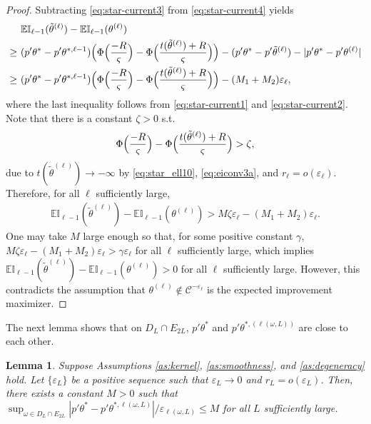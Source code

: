 \documentclass[letterpaper,11pt]{article}
\theoremstyle{myplain}
\newtheorem{lemma}{Lemma}[section]
\theoremstyle{mydefinition}
\theoremstyle{myremark}
\numberwithin{equation}{section}
\numberwithin{figure}{section}
\begin{document}
\begin{appendix}
\begin{proof}
Subtracting \eqref{eq:star-current3} from \eqref{eq:star-current4} yields
\begin{align}
&~\mathbb{EI}_{\ell-1}(\tilde\theta^{(\ell)})-\mathbb{EI}_{\ell-1}(\theta^{(\ell)})\notag\\
\ge &~ (p'\theta^*-p'\theta^{*,\ell-1})\Bigl(\Phi\Bigl(\frac{-R}{\varsigma}\Bigr)-\Phi\Bigl(\frac{t(\tilde\theta^{(\ell)})+R}{\varsigma}\Bigr)\Bigr)-(p'\theta^*-p'\tilde\theta^{(\ell)})-|p'\theta^*-p'\theta^{(\ell)}|\notag\\
\ge &~ (p'\theta^*-p'\theta^{*,\ell-1})\Bigl(\Phi\Bigl(\frac{-R}{\varsigma}\Bigr)-\Phi\Bigl(\frac{t(\tilde\theta^{(\ell)})+R}{\varsigma}\Bigr)\Bigr)- (M_1+M_2) \varepsilon_\ell,\label{eq:star-current5}
\end{align}
where the last inequality follows from \eqref{eq:star-current1} and \eqref{eq:star-current2}.
Note that there is a constant $\zeta>0$ s.t.
\begin{align}
\Phi\Bigl(\frac{-R}{\varsigma}\Bigr)-\Phi\Bigl(\frac{t(\tilde\theta^{(\ell)})+R}{\varsigma}\Bigr)>\zeta,\label{eq:star-current6}
\end{align}
due to $t(\tilde\theta^{(\ell)})\to-\infty$ by \eqref{eq:star_ell10}, \eqref{eq:eiconv3a}, and $r_\ell=o(\varepsilon_\ell)$. Therefore, for all $\ell$ sufficiently large,
\begin{align}
\mathbb{EI}_{\ell-1}(\tilde\theta^{(\ell)})-\mathbb{EI}_{\ell-1}(\theta^{(\ell)})>M\zeta\varepsilon_\ell - (M_1+M_2)\varepsilon_\ell.\label{eq:star-current7}
\end{align}
One may take $M$ large enough so that, for some  positive constant $\gamma$, $M\zeta\varepsilon_\ell - (M_1+M_2)\varepsilon_\ell>\gamma\varepsilon_\ell$ for all $\ell$ sufficiently large, which implies $\mathbb{EI}_{\ell-1}(\tilde\theta^{(\ell)})-\mathbb{EI}_{\ell-1}(\theta^{(\ell)})>0$ for all $\ell$ sufficiently large. However, this contradicts the assumption that $\theta^{(\ell)}\notin\mathcal C^{-\varepsilon_\ell}$ is the expected improvement maximizer.
\end{proof}

The next lemma shows that on $D_L\cap E_{2L}$, $p'\theta^*$ and $p'\theta^{*,(\ell(\omega,L))}$ are close to each other.
\begin{lemma}\label{lem:star-current_inner}
  Suppose Assumptions \ref{as:kernel}, \ref{as:smoothness}, and \ref{as:degeneracy} hold.	Let $\{\varepsilon_L\}$ be a positive sequence such that $\varepsilon_L\to 0$ and $r_L=o(\varepsilon_L)$.
  Then, there exists a constant $M>0$ such that $\sup_{\omega\in D_L\cap E_{2L}}|p'\theta^*-p'\theta^{*,\ell(\omega,L)}|/\varepsilon_{\ell(\omega,L)}\le M$   for all $L$ sufficiently large.
\end{lemma}



\end{appendix}
\end{document}
